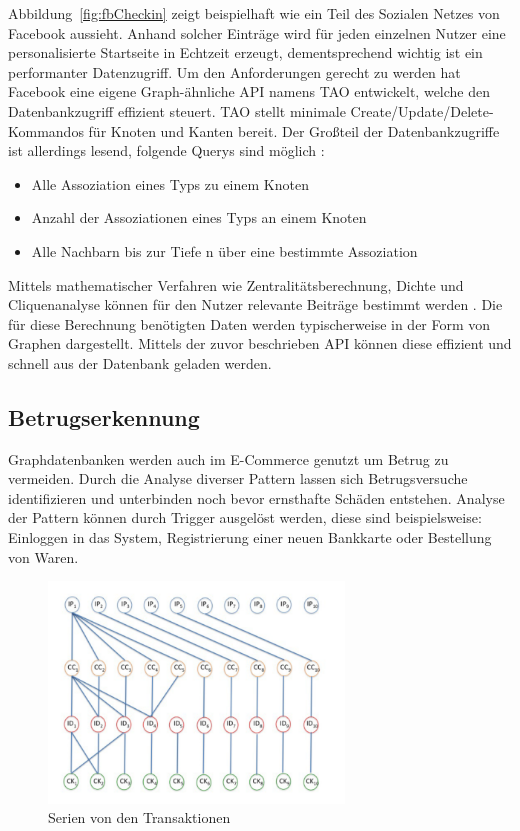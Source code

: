 Abbildung~\ref{fig:fbCheckin} zeigt beispielhaft wie ein Teil des Sozialen Netzes von Facebook aussieht. Anhand solcher Einträge wird für jeden einzelnen Nutzer eine personalisierte Startseite in Echtzeit erzeugt, dementsprechend wichtig ist ein performanter Datenzugriff. Um den Anforderungen gerecht zu werden hat Facebook eine eigene Graph-ähnliche API namens TAO entwickelt, welche den Datenbankzugriff effizient steuert. TAO stellt minimale Create/Update/Delete-Kommandos für Knoten und Kanten bereit. Der Großteil der Datenbankzugriffe ist allerdings lesend, folgende Querys sind möglich \cite{facebookTao}:
\begin{itemize}
	\item Alle Assoziation eines Typs zu einem Knoten
	\item Anzahl der Assoziationen eines Typs an einem Knoten
	\item Alle Nachbarn bis zur Tiefe n über eine bestimmte Assoziation
\end{itemize}

Mittels mathematischer Verfahren wie Zentralitätsberechnung, Dichte und Cliquenanalyse können für den Nutzer relevante Beiträge bestimmt werden \cite{sozialeNetzwerkanalyse}. Die für diese Berechnung benötigten Daten werden typischerweise in der Form von Graphen dargestellt. Mittels der zuvor beschrieben API können diese effizient und schnell aus der Datenbank geladen werden.


\subsection{Betrugserkennung}
Graphdatenbanken werden auch im E-Commerce genutzt um Betrug zu vermeiden. Durch die Analyse diverser Pattern lassen sich Betrugsversuche identifizieren und unterbinden noch bevor ernsthafte Schäden entstehen. Analyse der Pattern können durch Trigger ausgelöst werden, diese sind beispielsweise: Einloggen in das System, Registrierung einer neuen Bankkarte oder Bestellung von Waren.

\begin{figure}[h]
	\caption{Serien von den Transaktionen \cite{Betrugserkennung}}
	\label{fig:Trs}
	\centering
	\includegraphics[width=0.7\textwidth]{images/Betrugserkennung.png}
\end{figure}

